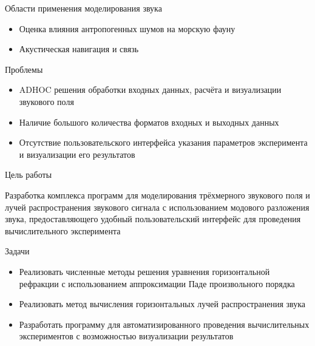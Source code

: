\documentclass[10pt, unicode]{beamer}
\begin{document}
    \begin{frame}[fragile]{Области применения моделирования звука}
        \begin{block}{}
            \begin{itemize}
                \item Оценка влияния антропогенных шумов на морскую фауну
                \item Акустическая навигация и связь
            \end{itemize}
        \end{block}
        \begin{block}{Проблемы}
            \begin{itemize}
                \item ADHOC решения обработки входных данных, расчёта и визуализации звукового поля
                \item Наличие большого количества форматов входных и выходных данных
                \item Отсутствие пользовательского интерфейса указания параметров эксперимента и визуализации его результатов
            \end{itemize}
        \end{block}
    \end{frame}
    
    \begin{frame}[fragile]{Цель работы}
        \begin{block}{}
            Разработка комплекса программ для моделирования трёхмерного звукового поля и лучей распространения звукового сигнала с использованием модового разложения звука, предоставляющего удобный пользовательский интерфейс для проведения вычислительного эксперимента
        \end{block}
        \begin{block}{Задачи}
            \begin{itemize}
                \item Реализовать численные методы решения уравнения горизонтальной рефракции с использованием аппроксимации Паде произвольного порядка
                \item Реализовать метод вычисления горизонтальных лучей распространения звука
                \item Разработать программу для автоматизированного проведения вычислительных экспериментов с возможностью визуализации результатов
            \end{itemize}
        \end{block}
    \end{frame}
\end{document}
